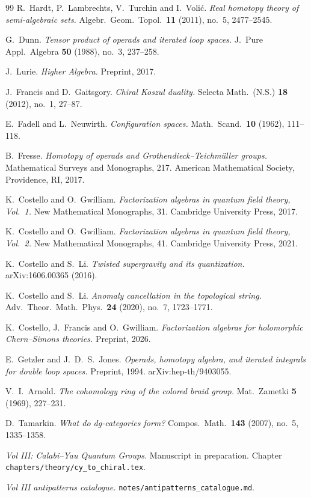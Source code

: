 \documentclass[11pt]{article}
\theoremstyle{definition}
\theoremstyle{remark}
\begin{document}
\begin{thebibliography}{99}
R.\ Hardt, P.\ Lambrechts, V.\ Turchin and I.\ Voli\'c.
\emph{Real homotopy theory of semi-algebraic sets.}
Algebr.\ Geom.\ Topol.\ \textbf{11} (2011), no.\ 5, 2477--2545.

G.\ Dunn.
\emph{Tensor product of operads and iterated loop spaces.}
J.\ Pure Appl.\ Algebra \textbf{50} (1988), no.\ 3, 237--258.

J.\ Lurie.
\emph{Higher Algebra.}
Preprint, 2017.

J.\ Francis and D.\ Gaitsgory.
\emph{Chiral Koszul duality.}
Selecta Math.\ (N.S.) \textbf{18} (2012), no.\ 1, 27--87.

E.\ Fadell and L.\ Neuwirth.
\emph{Configuration spaces.}
Math.\ Scand.\ \textbf{10} (1962), 111--118.

B.\ Fresse.
\emph{Homotopy of operads and Grothendieck--Teichm\"uller groups.}
Mathematical Surveys and Monographs, 217. American Mathematical Society, Providence, RI, 2017.

K.\ Costello and O.\ Gwilliam.
\emph{Factorization algebras in quantum field theory, Vol.\ 1.}
New Mathematical Monographs, 31. Cambridge University Press, 2017.

K.\ Costello and O.\ Gwilliam.
\emph{Factorization algebras in quantum field theory, Vol.\ 2.}
New Mathematical Monographs, 41. Cambridge University Press, 2021.

K.\ Costello and S.\ Li.
\emph{Twisted supergravity and its quantization.}
arXiv:1606.00365 (2016).

K.\ Costello and S.\ Li.
\emph{Anomaly cancellation in the topological string.}
Adv.\ Theor.\ Math.\ Phys.\ \textbf{24} (2020), no.\ 7, 1723--1771.

K.\ Costello, J.\ Francis and O.\ Gwilliam.
\emph{Factorization algebras for holomorphic Chern--Simons theories.}
Preprint, 2026.

E.\ Getzler and J.\ D.\ S.\ Jones.
\emph{Operads, homotopy algebra, and iterated integrals for double loop spaces.}
Preprint, 1994. arXiv:hep-th/9403055.

V.\ I.\ Arnold.
\emph{The cohomology ring of the colored braid group.}
Mat.\ Zametki \textbf{5} (1969), 227--231.

D.\ Tamarkin.
\emph{What do dg-categories form?}
Compos.\ Math.\ \textbf{143} (2007), no.\ 5, 1335--1358.

\emph{Vol III: Calabi--Yau Quantum Groups.}
Manuscript in preparation. Chapter \texttt{chapters/theory/cy\_to\_chiral.tex}.

\emph{Vol III antipatterns catalogue.}
\texttt{notes/antipatterns\_catalogue.md}.

\end{thebibliography}
\end{document}
